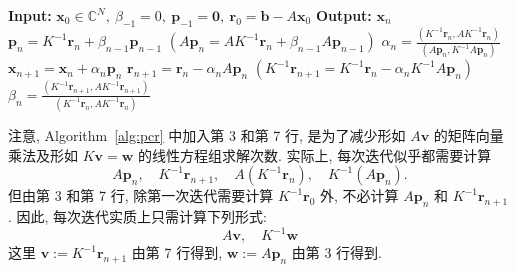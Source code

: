 \begin{algorithm}[H]\caption{{预条件 CR 方法}}\label{alg:pcr}\begin{algorithmic}[1]
\Statex\textbf{Input:} $\bm x_0\in\mathbb C^N,\ \beta_{-1}=0,\ \bm p_{-1}=\bm0,\ \bm r_0=\bm b-A\bm x_0$
\Statex\textbf{Output:} $\bm x_n$
\State $\bm p_n=K^{-1}\bm r_n+\beta_{n-1}\bm p_{n-1}$
\State $(A\bm p_n=AK^{-1}\bm r_n+\beta_{n-1}A\bm p_{n-1})$
\State $\alpha_n=\frac{(K^{-1}\bm r_n,AK^{-1}\bm r_n)}{(A\bm p_n,K^{-1}A\bm p_n)}$
\State $\bm x_{n+1}=\bm x_n+\alpha_n\bm p_n$
\State $\bm r_{n+1}=\bm r_n-\alpha_nA\bm p_n$
\State $(K^{-1}\bm r_{n+1}=K^{-1}\bm r_n-\alpha_nK^{-1}A\bm p_n)$
\State $\beta_n=\frac{(K^{-1}\bm r_{n+1},AK^{-1}\bm r_{n+1})}{(K^{-1}\bm r_n,AK^{-1}\bm r_n)}$
\EndFor\end{algorithmic}\end{algorithm}
{注意, Algorithm\ \ref{alg:pcr} 中加入第 3 和第 7 行, 是为了减少形如 $A\bm v$ 的矩阵向量乘法及形如 $K\bm v=\bm w$ 的线性方程组求解次数. 实际上, 每次迭代似乎都需要计算}
\[A\bm p_n,\quad K^{-1}\bm r_{n+1},\quad A(K^{-1}\bm r_n),\quad K^{-1}(A\bm p_n).\]
{但由第 3 和第 7 行, 除第一次迭代需要计算 $K^{-1}\bm r_0$ 外, 不必计算 $A\bm p_n$ 和 $K^{-1}\bm r_{n+1}$. 因此, 每次迭代实质上只需计算下列形式:}
\[A\bm v,\quad K^{-1}\bm w\]
{这里 $\bm v:=K^{-1}\bm r_{n+1}$ 由第 7 行得到, $\bm w:=A\bm p_n$ 由第 3 行得到.}
